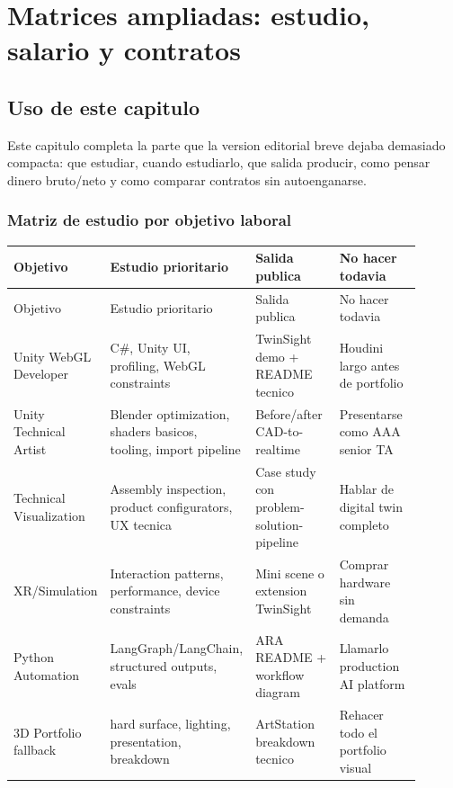 \chapter{Matrices ampliadas: estudio, salario y contratos}

\section{Uso de este capitulo}


Este capitulo completa la parte que la version editorial breve dejaba demasiado compacta: que estudiar, cuando estudiarlo, que salida producir, como pensar dinero bruto/neto y como comparar contratos sin autoenganarse.


\subsection{Matriz de estudio por objetivo laboral}


\begin{center}
\scriptsize
\begin{longtable}{>{\raggedright\arraybackslash}p{0.225\linewidth} >{\raggedright\arraybackslash}p{0.225\linewidth} >{\raggedright\arraybackslash}p{0.225\linewidth} >{\raggedright\arraybackslash}p{0.225\linewidth}}
\toprule
Objetivo & Estudio prioritario & Salida publica & No hacer todavia \\
\midrule
\endfirsthead
\toprule
Objetivo & Estudio prioritario & Salida publica & No hacer todavia \\
\midrule
\endhead
Unity WebGL Developer & C\#, Unity UI, profiling, WebGL constraints & TwinSight demo + README tecnico & Houdini largo antes de portfolio \\
Unity Technical Artist & Blender optimization, shaders basicos, tooling, import pipeline & Before/after CAD-to-realtime & Presentarse como AAA senior TA \\
Technical Visualization & Assembly inspection, product configurators, UX tecnica & Case study con problem-solution-pipeline & Hablar de digital twin completo \\
XR/Simulation & Interaction patterns, performance, device constraints & Mini scene o extension TwinSight & Comprar hardware sin demanda \\
Python Automation & LangGraph/LangChain, structured outputs, evals & ARA README + workflow diagram & Llamarlo production AI platform \\
3D Portfolio fallback & hard surface, lighting, presentation, breakdown & ArtStation breakdown tecnico & Rehacer todo el portfolio visual \\
\bottomrule
\end{longtable}
\end{center}


